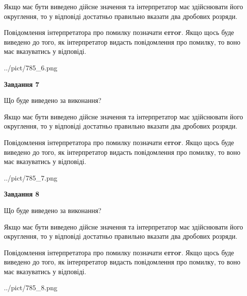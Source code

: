 \documentclass[12pt, ukrainian]{article}
\begin{document}
{\begin {Large}
Якщо має бути виведено дійсне значення та інтерпретатор має здійснювати його округлення, 
то у відповіді достатньо правильно вказати два дробових розряди.

Повідомлення інтерпретатора про помилку позначати \textbf{error}.
Якщо щось буде виведено до того, як інтерпретатор видасть повідомлення про помилку, 
то воно має вказуватись у відповіді. \par

\begin{center}
	{../pict/785_6.png}
\end{center}
\newpage

{\begin {center}\textbf{Завдання 7}\end {center}}\par
Що буде виведено за виконання? \par

Якщо має бути виведено дійсне значення та інтерпретатор має здійснювати його округлення, 
то у відповіді достатньо правильно вказати два дробових розряди.

Повідомлення інтерпретатора про помилку позначати \textbf{error}.
Якщо щось буде виведено до того, як інтерпретатор видасть повідомлення про помилку, 
то воно має вказуватись у відповіді. \par

\begin{center}
	{../pict/785_7.png}
\end{center}
\newpage

{\begin {center}\textbf{Завдання 8}\end {center}}\par
Що буде виведено за виконання? \par

Якщо має бути виведено дійсне значення та інтерпретатор має здійснювати його округлення, 
то у відповіді достатньо правильно вказати два дробових розряди.

Повідомлення інтерпретатора про помилку позначати \textbf{error}.
Якщо щось буде виведено до того, як інтерпретатор видасть повідомлення про помилку, 
то воно має вказуватись у відповіді. \par

\begin{center}
	{../pict/785_8.png}
\end{center}
\newpage


\end{Large}}
\end{document}
